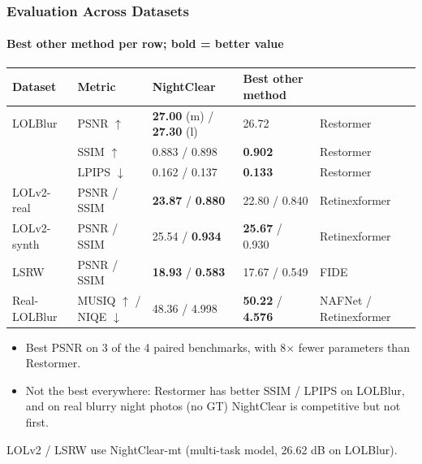 \begin{frame}
    \frametitle{Evaluation Across Datasets}
    \framesubtitle{Best other method per row; bold = better value}

    \begin{center}
    \footnotesize
    \begin{tabular}{lllll}
        \toprule
        \textbf{Dataset} & \textbf{Metric} & \textbf{NightClear} & \textbf{Best other method} & \\
        \midrule
        LOLBlur & PSNR $\uparrow$  & \textbf{27.00} (m) / \textbf{27.30} (l) & 26.72 & Restormer \\
                & SSIM $\uparrow$  & 0.883 / 0.898 & \textbf{0.902} & Restormer \\
                & LPIPS $\downarrow$ & 0.162 / 0.137 & \textbf{0.133} & Restormer \\
        LOLv2-real  & PSNR / SSIM & \textbf{23.87} / \textbf{0.880} & 22.80 / 0.840 & Retinexformer \\
        LOLv2-synth & PSNR / SSIM & 25.54 / \textbf{0.934} & \textbf{25.67} / 0.930 & Retinexformer \\
        LSRW        & PSNR / SSIM & \textbf{18.93} / \textbf{0.583} & 17.67 / 0.549 & FIDE \\
        Real-LOLBlur & MUSIQ $\uparrow$ / NIQE $\downarrow$ & 48.36 / 4.998 & \textbf{50.22} / \textbf{4.576} & NAFNet / Retinexformer \\
        \bottomrule
    \end{tabular}
    \end{center}
    \vspace{1mm}
    \footnotesize
    \begin{itemize}
        \item Best PSNR on 3 of the 4 paired benchmarks, with 8$\times$ fewer parameters than Restormer.
        \item Not the best everywhere: Restormer has better SSIM / LPIPS on LOLBlur, and on real blurry night photos (no GT) NightClear is competitive but not first.
    \end{itemize}
    {\tiny LOLv2 / LSRW use NightClear-mt (multi-task model, 26.62 dB on LOLBlur).}
\end{frame}

